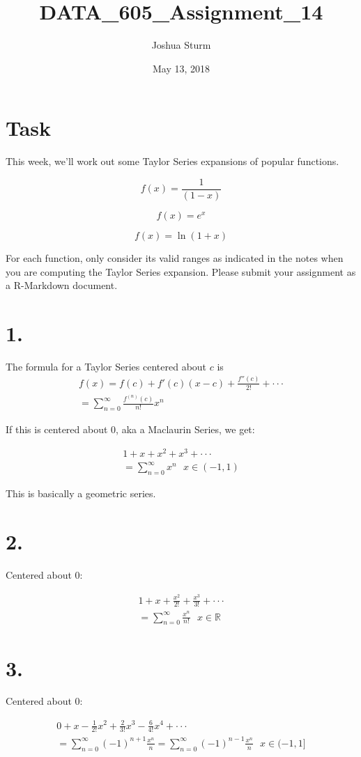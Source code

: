 \documentclass[]{article}
\title{DATA\_605\_Assignment\_14}
\author{Joshua Sturm}
\date{May 13, 2018}
\begin{document}
\maketitle

\hypertarget{task}{%
\section{Task}\label{task}}

This week, we'll work out some Taylor Series expansions of popular
functions.

\[
f(x) = \frac{1}{(1-x)}
\]

\[
f(x) = e^x
\]

\[
f(x) = \ln(1 + x)
\]

For each function, only consider its valid ranges as indicated in the
notes when you are computing the Taylor Series expansion. Please submit
your assignment as a R-Markdown document.

\hypertarget{section}{%
\section{1.}\label{section}}

The formula for a Taylor Series centered about \(c\) is \begin{gather*}
f(x) = f(c) + f'(c)(x-c) + \frac{f''(c)}{2!} + \cdot\cdot\cdot \\
= \sum_{n=0}^{\infty}\frac{f^{(n)}(c)}{n!}x^n
\end{gather*}

If this is centered about 0, aka a Maclaurin Series, we get:

\begin{gather*}
1 + x + x^2 + x^3 + \cdot\cdot\cdot \\
= \sum_{n = 0}^{\infty}x^n \ \ \ x \in (-1, 1)
\end{gather*}

This is basically a geometric series.

\hypertarget{section-1}{%
\section{2.}\label{section-1}}

Centered about 0:

\begin{gather*}
1 + x + \frac{x^2}{2!} + \frac{x^3}{3!} + \cdot\cdot\cdot \\
= \sum_{n = 0}^{\infty} \frac{x^n}{n!} \ \ \ x \in \mathbb{R}
\end{gather*}

\hypertarget{section-2}{%
\section{3.}\label{section-2}}

Centered about 0:

\begin{gather*}
0 + x - \frac{1}{2!}x^2 + \frac{2}{3!}x^3 - \frac{6}{4!}x^4 + \cdot\cdot\cdot \\
= \sum_{n = 0}^{\infty}(-1)^{n+1}\frac{x^n}{n} = \sum_{n = 0}^{\infty}(-1)^{n-1}\frac{x^n}{n} \ \ \ x \in (-1, 1]
\end{gather*}
\end{document}
